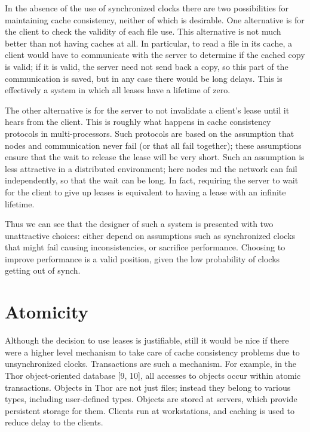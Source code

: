 \documentclass[a4paper,11pt,notitlepage,twoside,openright]{article}
\begin{document}
In the absence of the use of synchronized clocks there are two
possibilities for maintaining cache consistency, neither of which is
desirable. One alternative is for the client to check the validity of
each file use. This alternative is not much better than not having
caches at all. In particular, to read a file in its cache, a client
would have to communicate with the server to determine if the cached
copy is valid; if it is valid, the server need not send back a copy, so
this part of the communication is saved, but in any case there would be
long delays. This is effectively a system in which all leases have a
lifetime of zero.

The other alternative is for the server to not invalidate a client's
lease until it hears from the client. This is roughly what happens in
cache consistency protocols in multi-processors. Such protocols are
based on the assumption that nodes and communication never fail (or that
all fail together); these assumptions ensure that the wait to release
the lease will be very short. Such an assumption is less attractive in a
distributed environment; here nodes md the network can fail
independently, so that the wait can be long. In fact, requiring the
server to wait for the client to give up leases is equivalent to having
a lease with an infinite lifetime.

Thus we can see that the designer of such a system is presented with two
unattractive choices: either depend on assumptions such as synchronized
clocks that might fail causing inconsistencies, or sacrifice
performance. Choosing to improve performance is a valid position, given
the low probability of clocks getting out of synch.


\hypertarget{atomicity}{%
\section{Atomicity}\label{atomicity}}


Although the decision to use leases is justifiable, still it would be
nice if there were a higher level mechanism to take care of cache
consistency problems due to unsynchronized clocks. Transactions are such
a mechanism. For example, in the Thor object-oriented database {[}9,
10{]}, all accesses to objects occur within atomic transactions. Objects
in Thor are not just files; instead they belong to various types,
including user-defined types. Objects are stored at servers, which
provide persistent storage for them. Clients run at workstations, and
caching is used to reduce delay to the clients.
\end{document}

